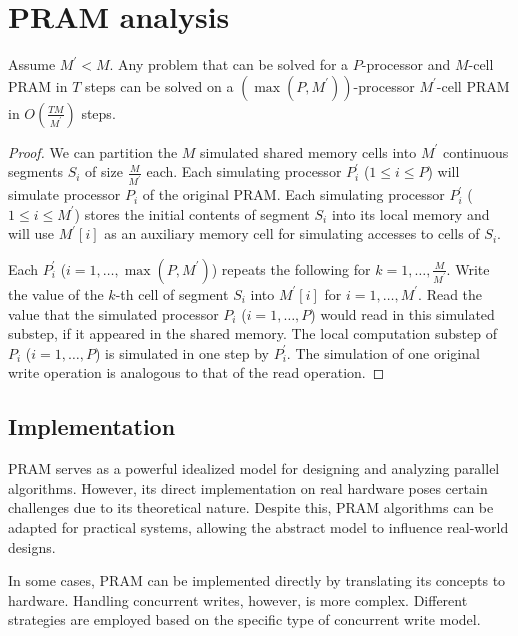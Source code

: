 \section{PRAM analysis}

\begin{lemma}
    Assume $M^\prime < M$. 
    Any problem that can be solved for a $P$-processor and $M$-cell PRAM in $T$ steps can be solved on a $(\max(P, M^\prime))$-processor $M^\prime$-cell PRAM in $O\left(\frac{TM}{M^\prime}\right)$ steps.
\end{lemma}

\begin{proof}
    We can partition the $M$ simulated shared memory cells into $M^\prime$ continuous segments $S_i$ of size $\frac{M}{M^\prime}$ each.
    Each simulating processor $P^\prime_i$ ($1 \leq i \leq P$) will simulate processor $P_i$ of the original PRAM.
    Each simulating processor $P^\prime_i$ ($1 \leq i \leq M^\prime$) stores the initial contents of segment $S_i$ into its local memory and will use $M^\prime[i]$ as an auxiliary memory cell for simulating accesses to cells of $S_i$.
    
    Each $P^\prime_i$ ($i=1, \ldots, \max(P, M^\prime)$) repeats the following for $k = 1, \ldots, \frac{M}{M^\prime}$. 
    Write the value of the $k$-th cell of segment $S_i$ into $M^\prime[i]$ for $i=1, \ldots, M^\prime$.
    Read the value that the simulated processor $P_i$ ($i=1, \ldots, P$) would read in this simulated substep, if it appeared in the shared memory.
    The local computation substep of $P_i$ ($i=1, \ldots, P$) is simulated in one step by $P^\prime_i$.
    The simulation of one original write operation is analogous to that of the read operation.
\end{proof}

\subsection{Implementation}
PRAM serves as a powerful idealized model for designing and analyzing parallel algorithms. 
However, its direct implementation on real hardware poses certain challenges due to its theoretical nature. 
Despite this, PRAM algorithms can be adapted for practical systems, allowing the abstract model to influence real-world designs.

In some cases, PRAM can be implemented directly by translating its concepts to hardware. 
Handling concurrent writes, however, is more complex.
Different strategies are employed based on the specific type of concurrent write model. 

